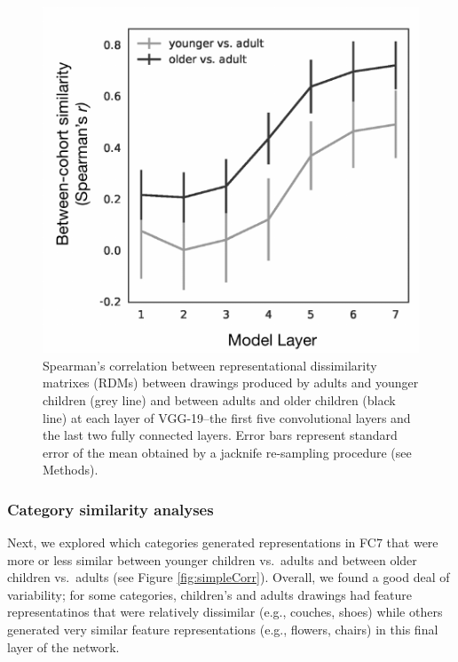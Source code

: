 \documentclass[10pt, letterpaper]{article}
\newenvironment{CodeChunk}{}{}
\begin{document}
\begin{CodeChunk}
\begin{figure}[H]

{\centering \includegraphics{figs/layerWise-1} 

}

\caption[Spearman's correlation between representational dissimilarity matrixes (RDMs) between drawings produced by adults and younger children (grey line) and between adults and older children (black line) at each layer of VGG-19--the first five convolutional layers and the last two fully connected layers]{Spearman's correlation between representational dissimilarity matrixes (RDMs) between drawings produced by adults and younger children (grey line) and between adults and older children (black line) at each layer of VGG-19--the first five convolutional layers and the last two fully connected layers. Error bars represent standard error of the mean obtained by a jacknife re-sampling procedure (see Methods).}\label{fig:layerWise}
\end{figure}
\end{CodeChunk}

\subsubsection{Category similarity
analyses}\label{category-similarity-analyses-1}

Next, we explored which categories generated representations in FC7 that
were more or less similar between younger children vs.~adults and
between older children vs.~adults (see Figure \ref{fig:simpleCorr}).
Overall, we found a good deal of variability; for some categories,
children's and adults drawings had feature representatinos that were
relatively dissimilar (e.g., couches, shoes) while others generated very
similar feature representations (e.g., flowers, chairs) in this final
layer of the network.
\end{document}
